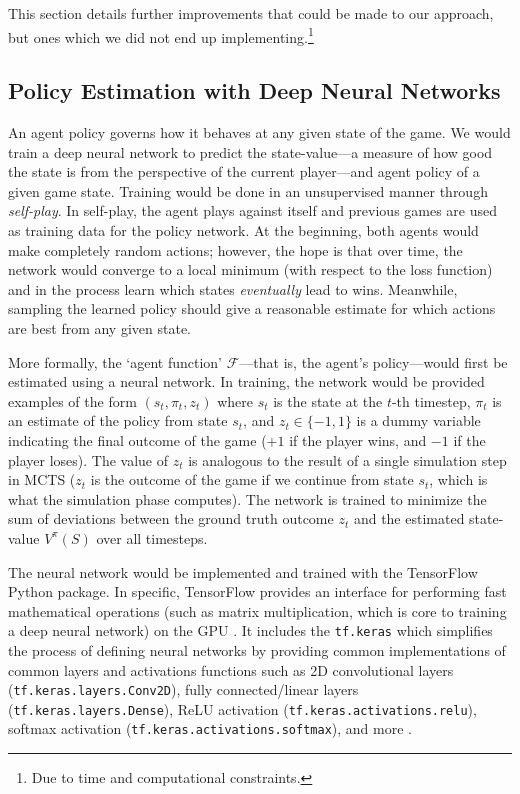 \documentclass{paper}
\begin{document}
This section details further improvements that could be made to our approach, but ones which we did not end up implementing.\footnote{Due to time and computational constraints.}

\subsection{Policy Estimation with Deep Neural Networks}\label{sec:policy_estimation}
An agent policy governs how it behaves at any given state of the game. We would train a deep neural network to predict the state-value---a measure of how good the state is from the perspective of the current player---and agent policy of a given game state. Training would be done in an unsupervised manner through \textit{self-play}. In self-play, the agent plays against itself and previous games are used as training data for the policy network. At the beginning, both agents would make completely random actions; however, the hope is that over time, the network would converge to a local minimum (with respect to the loss function) and in the process learn which states \textit{eventually} lead to wins. Meanwhile, sampling the learned policy should give a reasonable estimate for which actions are best from any given state.

More formally, the `agent function' $\mathcal{F}$---that is, the agent's policy---would first be estimated using a neural network. In training, the network would be provided examples of the form $(s_t,\pi_t,z_t)$ where $s_t$ is the state at the $t$-th timestep, $\pi_t$ is an estimate of the policy from state $s_t$, and $z_t\in\{-1,1\}$ is a dummy variable indicating the final outcome of the game ($+1$ if the player wins, and $-1$ if the player loses). The value of $z_t$ is analogous to the result of a single simulation step in MCTS ($z_t$ is the outcome of the game if we continue from state $s_t$, which is what the simulation phase computes). The network is trained to minimize the sum of deviations between the ground truth outcome $z_t$ and the estimated state-value $V^\pi(S)$ over all timesteps.

The neural network would be implemented and trained with the TensorFlow Python package. In specific, TensorFlow provides an interface for performing fast mathematical operations (such as matrix multiplication,  which is core to training a deep neural  network) on the GPU \cite{tensorflow2015-whitepaper}. It includes the \texttt{tf.keras} which simplifies the process of defining neural networks by providing common implementations of common layers and activations functions such as 2D convolutional layers (\texttt{tf.keras.layers.Conv2D}), fully connected/linear layers (\texttt{tf.keras.layers.Dense}), ReLU activation (\texttt{tf.keras.activations.relu}), softmax activation (\texttt{tf.keras.activations.softmax}), and more \cite{tf_keras_docs}. 
\end{document}
